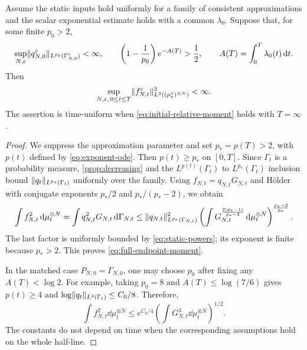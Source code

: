 \documentclass[11pt,reqno]{amsart}
\numberwithin{equation}{section}
\theoremstyle{plain}
\theoremstyle{remark}
\DeclarePairedDelimiter{\norm}{\lVert}{\rVert}
\begin{document}
\begin{cor}\label{cor:full-moment}
Assume the static inputs hold uniformly for a family of consistent approximations and the scalar exponential estimate holds with a common $\lambda_0$. Suppose that, for some finite $p_0>2$,
\begin{equation}\label{eq:initial-relative-moment}
 \sup_{N,\varepsilon}\norm{q_{N,0}^{\varepsilon}}_{L^{p_0}(\Gamma_{N,0}^{\varepsilon})}<\infty,
 \qquad
 \left(1-\frac1{p_0}\right)e^{-A(T)}>\frac12,
 \qquad A(T)=\int_0^T\lambda_0(t)\dd t.
\end{equation}
Then
\begin{equation}\label{eq:full-endpoint-moment}
 \sup_{N,\varepsilon,\,0\le t\le T}
 \norm{f_{N,t}^{\varepsilon}}_{L^2((\mu_t^{\varepsilon})^{\otimes N})}^2<\infty.
\end{equation}
The assertion is time-uniform when \eqref{eq:initial-relative-moment} holds with $T=\infty$.
\end{cor}
\begin{proof}
We suppress the approximation parameter and set $p_*=p(T)>2$, with $p(t)$ defined by \eqref{eq:exponent-ode}. Then $p(t)\ge p_*$ on $[0,T]$. Since $\Gamma_t$ is a probability measure, \cref{prop:decreasing} and the $L^{p(t)}(\Gamma_t)$ to $L^{p_*}(\Gamma_t)$ inclusion bound $\norm{q_t}_{L^{p_*}(\Gamma_t)}$ uniformly over the family. Using $f_{N,t}=q_{N,t}G_{N,t}$ and H\"older with conjugate exponents $p_*/2$ and $p_*/(p_*-2)$, we obtain
\begin{equation}
 \int f_{N,t}^2\dd\mu_t^{\otimes N} =\int q_{N,t}^2G_{N,t}\dd\Gamma_{N,t} \le\norm{q_{N,t}}_{L^{p_*}(\Gamma_{N,t})}^2 \left(\int G_{N,t}^{\frac{2(p_*-1)}{p_*-2}}\dd\mu_t^{\otimes N}\right)^{\frac{p_*-2}{p_*}}. \label{eq:full-holder}
\end{equation}
The last factor is uniformly bounded by \eqref{eq:static-powers}; its exponent is finite because $p_*>2$. This proves \eqref{eq:full-endpoint-moment}.

In the matched case $P_{N,0}=\Gamma_{N,0}$, one may choose $p_0$ after fixing any $A(T)<\log2$. For example, taking $p_0=8$ and $A(T)\le\log(7/6)$ gives $p(t)\ge4$ and $\log\norm{q_t}_{L^4(\Gamma_t)}\le C_0/8$. Therefore,
\begin{equation}\label{eq:explicit-full}
 \int f_{N,t}^2\dd\mu_t^{\otimes N}
       \le e^{C_0/4}\left(\int G_{N,t}^3\dd\mu_t^{\otimes N}\right)^{1/2}.
\end{equation}
The constants do not depend on time when the corresponding assumptions hold on the whole half-line.
\end{proof}
\end{document}
